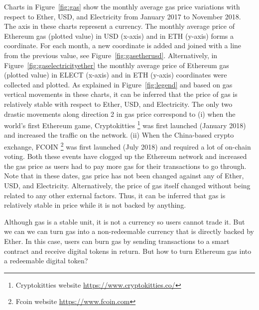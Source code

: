 Charts in Figure~\ref{fig:gas} show the monthly average gas price variations with respect to Ether, USD, and Electricity from January 2017 to November 2018. The axis in these charts represent a currency. The monthly average price of  Ethereum gas (plotted value) in USD (x-axis) and in ETH (y-axis) forms a coordinate. For each month, a new coordinate is added and joined with a line from the previous value, see Figure~\ref{fig:gasetherusd}. Alternatively, in Figure~\ref{fig:gaselectricityether} the monthly average price of  Ethereum gas (plotted value) in ELECT (x-axis) and in ETH (y-axis) coordinates were collected and plotted. As explained in Figure~\ref{fig:legend} and based on  gas vertical movements in these charts, it can be inferred that the price of gas is relatively stable with respect to Ether, USD, and Electricity. The only two drastic movements along direction 2 in gas price correspond to (i) when the world's first Ethereum game, Cryptokitties \footnote{Cryptokitties website \url{https://www.cryptokitties.co/}} was first launched (January 2018) and increased the traffic on the network. (ii) When the China-based crypto exchange, FCOIN \footnote{Fcoin website \url{https://www.fcoin.com}} was first launched (July 2018) and required a lot of on-chain voting. Both these events have clogged up the Ethereum network and increased the gas price as users had to pay more gas for their transactions to go through. Note that in these dates, gas price has not been changed against any of Ether, USD, and Electricity. Alternatively, the price of gas itself changed without being related to any other external factors. Thus, it can be inferred that gas is relatively stable in price while it is not backed by anything. \par

Although gas is a stable unit, it is not a currency so users cannot trade it. But we can we can turn gas  into a non-redeemable currency that is directly backed by Ether. In this case, users can burn gas by sending transactions to a smart contract and receive digital tokens in return. But how to turn Ethereum gas into a redeemable digital token? \par

